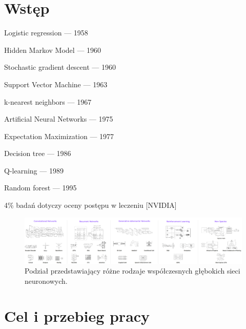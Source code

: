 \chapter{Wstęp}

Logistic regression — 1958 

Hidden Markov Model — 1960 

Stochastic gradient descent — 1960 

Support Vector Machine — 1963 

k-nearest neighbors — 1967 

Artificial Neural Networks — 1975 

Expectation Maximization — 1977 

Decision tree — 1986 

Q-learning — 1989 

Random forest — 1995 

4\% badań dotyczy oceny postępu w leczeniu [NVIDIA]

\begin{figure}[h!]
	\centering
	\includegraphics[width=1.0\textwidth]{figures/rodzajeSieciNeuronowych.png}
	\caption{Podział przedstawiający różne rodzaje współczesnych głębokich sieci neuronowych.}
	\label{DLcambrianExplosion}
\end{figure}
\chapter{Cel i przebieg pracy}




